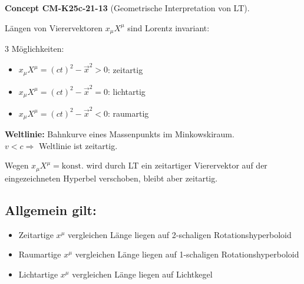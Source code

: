 \documentclass[10pt, letterpaper]{article}
\newcommand{\CustomHeading}[3]{%
  \par\medskip\noindent%
  \textbf{#1 #2} \textnormal{(#3)}.\enskip%
}
\newenvironment{CONC}[2]{\CustomHeading{Concept}{#1}{#2}}{}
\begin{document}
\begin{CONC}{CM-K25c-21-13}{Geometrische Interpretation von LT}
Längen von Vierervektoren $x_\mu X^\mu$ sind Lorentz invariant:

3 Möglichkeiten:
\begin{itemize}
\item $x_\mu X^\mu = (ct)^2 - \vec{x}^2 > 0$: zeitartig
\item $x_\mu X^\mu = (ct)^2 - \vec{x}^2 = 0$: lichtartig
\item $x_\mu X^\mu = (ct)^2 - \vec{x}^2 < 0$: raumartig
\end{itemize}

\textbf{Weltlinie:} Bahnkurve eines Massenpunkts im Minkowskiraum.\\
$v < c \Rightarrow$ Weltlinie ist zeitartig.


Wegen $x_\mu X^\mu = \text{konst.}$ wird durch LT ein zeitartiger Vierervektor auf der eingezeichneten Hyperbel verschoben, bleibt aber zeitartig.
\subsection*{Allgemein gilt:}
\begin{itemize}
\item Zeitartige $x^\mu$ vergleichen Länge liegen auf 2-schaligen Rotationshyperboloid
\item Raumartige $x^\mu$ vergleichen Länge liegen auf 1-schaligen Rotationshyperboloid
\item Lichtartige $x^\mu$ vergleichen Länge liegen auf Lichtkegel
\end{itemize}
\end{CONC}
\end{document}
